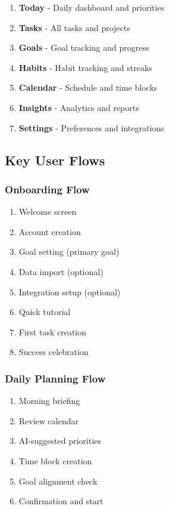 \begin{enumerate}
    \item \textbf{Today} - Daily dashboard and priorities
    \item \textbf{Tasks} - All tasks and projects
    \item \textbf{Goals} - Goal tracking and progress
    \item \textbf{Habits} - Habit tracking and streaks
    \item \textbf{Calendar} - Schedule and time blocks
    \item \textbf{Insights} - Analytics and reports
    \item \textbf{Settings} - Preferences and integrations
\end{enumerate}

\subsection{Key User Flows}

\subsubsection{Onboarding Flow}

\begin{enumerate}
    \item Welcome screen
    \item Account creation
    \item Goal setting (primary goal)
    \item Data import (optional)
    \item Integration setup (optional)
    \item Quick tutorial
    \item First task creation
    \item Success celebration
\end{enumerate}

\subsubsection{Daily Planning Flow}

\begin{enumerate}
    \item Morning briefing
    \item Review calendar
    \item AI-suggested priorities
    \item Time block creation
    \item Goal alignment check
    \item Confirmation and start
\end{enumerate}

